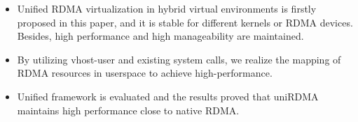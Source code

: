 \begin{itemize}
	\item Unified RDMA virtualization in hybrid virtual environments is firstly proposed in this paper, and it is stable for different kernels or RDMA devices. Besides, high performance and high manageability are maintained.  
	
	\item  By utilizing vhost-user and existing system calls, we realize the mapping of RDMA resources in userspace to achieve high-performance.  
	
	\item Unified framework is evaluated and the results proved that uniRDMA maintains high performance close to native RDMA.
\end{itemize}

